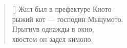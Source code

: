 \documentclass[a5paper,11pt]{memoir}
\begin{document}
\newpage
\hfill
{}
\BgThispage
\newpage


\PlainPoemTitle
{}
\label{poem:mitsumoto.ru}
\begin{verse}[\versewidth]
Жил был в префектуре Киото\\
рыжий кот --- господин Мыцумото.\\
Прыгнув однажды в окно, \\
хвостом он задел кимоно. 
\end{verse}
\end{document}
